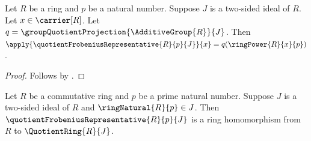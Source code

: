 \begin{proposition}\label{quotient_frobenius_representative_apply}
    Let $R$ be a ring and $p$ be a natural number.
    Suppose $J$ is a two-sided ideal of $R$.
    Let $x\in\carrier[R]$.
    Let $q=\groupQuotientProjection{\AdditiveGroup{R}}{J}$.
    Then
        $\apply{\quotientFrobeniusRepresentative{R}{p}{J}}{x}
            =q(\ringPower{R}{x}{p})$.
\end{proposition}
\begin{proof}
    Follows by
        .
\end{proof}

\begin{theorem}\label{quotient_frobenius_representative_hom}
    Let $R$ be a commutative ring and $p$ be a prime natural number.
    Suppose $J$ is a two-sided ideal of $R$ and
        $\ringNatural{R}{p}\in J$.
    Then $\quotientFrobeniusRepresentative{R}{p}{J}$
        is a ring homomorphism from $R$ to $\QuotientRing{R}{J}$.
\end{theorem}
